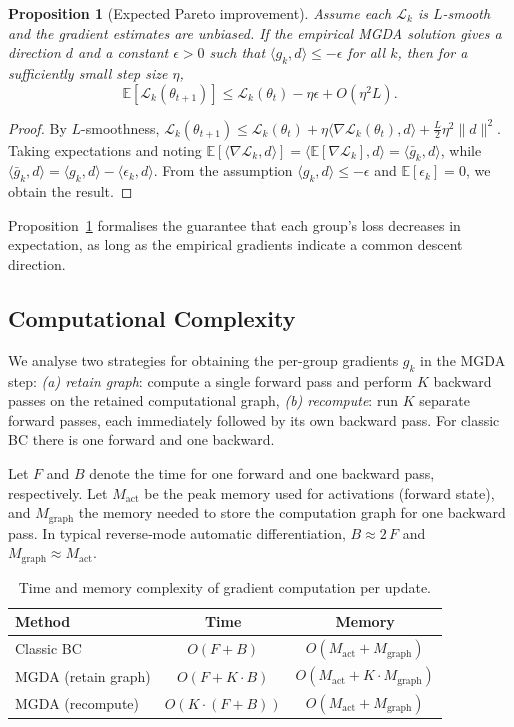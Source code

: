 \documentclass[conference]{IEEEtran}
\newcommand{\E}{\mathbb{E}}
\newtheorem{proposition}{Proposition}
\begin{document}
\begin{proposition}[Expected Pareto improvement]
\label{prop:improve}
Assume each $\mathcal{L}_k$ is $L$-smooth and the gradient estimates are unbiased.
If the empirical MGDA solution gives a direction $d$ and a constant $\epsilon>0$ such that
$\langle g_k, d\rangle \le -\epsilon$ for all $k$, then for a sufficiently small step size $\eta$,
\[
\E[\mathcal{L}_k(\theta_{t+1})] \le \mathcal{L}_k(\theta_t) - \eta\epsilon + O(\eta^2 L).
\]
\end{proposition}
\begin{proof}
By $L$-smoothness,
$\mathcal{L}_k(\theta_{t+1}) \le \mathcal{L}_k(\theta_t) + \eta \langle \nabla\mathcal{L}_k(\theta_t), d\rangle + \frac{L}{2}\eta^2 \|d\|^2$.
Taking expectations and noting $\E[\langle \nabla\mathcal{L}_k, d\rangle] = \langle \E[\nabla\mathcal{L}_k], d\rangle = \langle \bar{g}_k, d\rangle$,
while $\langle \bar{g}_k, d\rangle = \langle g_k, d\rangle - \langle \epsilon_k, d\rangle$.
From the assumption $\langle g_k, d\rangle \le -\epsilon$ and $\E[\epsilon_k]=0$, we obtain the result.
\end{proof}

Proposition~\ref{prop:improve} formalises the guarantee that each group’s loss decreases in expectation,
as long as the empirical gradients indicate a common descent direction.

\subsection{Computational Complexity}
\label{sec:complexity}
We analyse two strategies for obtaining the per-group gradients $g_k$ in the MGDA step:
\textit{(a) retain graph}: compute a single forward pass and perform $K$ backward passes on the retained computational graph,
\textit{(b) recompute}: run $K$ separate forward passes, each immediately followed by its own backward pass.
For classic BC there is one forward and one backward.

Let $F$ and $B$ denote the time for one forward and one backward pass, respectively.
Let $M_{\text{act}}$ be the peak memory used for activations (forward state),
and $M_{\text{graph}}$ the memory needed to store the computation graph for one backward pass.
In typical reverse‑mode automatic differentiation, $B \approx 2\,F$ and $M_{\text{graph}} \approx M_{\text{act}}$.

\begin{table}[H]
\centering
\caption{Time and memory complexity of gradient computation per update.}
\begin{tabular}{lcc}
\toprule
Method & Time & Memory \\
\midrule
Classic BC                    & $O(F + B)$               & $O(M_{\text{act}} + M_{\text{graph}})$ \\
MGDA (retain graph)           & $O(F + K\cdot B)$        & $O(M_{\text{act}} + K\cdot M_{\text{graph}})$ \\
MGDA (recompute)              & $O(K\cdot(F + B))$       & $O(M_{\text{act}} + M_{\text{graph}})$ \\
\bottomrule
\end{tabular}
\label{tab:complexity}
\end{table}
\end{document}
